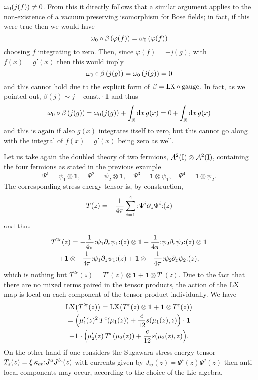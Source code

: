  $\omega_0(j(f))\neq 0$. From this it directly follows that
 a similar argument applies to the non-existence of 
 a vacuum preserving isomorphism for Bose fields; in 
 fact, if this were true then we would have
 \[
 \omega_0\circ\beta\left(\varphi(f)\right)=
 \omega_0\left(\varphi(f)\right)
 \]
 choosing $f$ integrating to zero. Then, since 
 $\varphi(f)=-j(g)$, with $f(x)=g'(x)$ then this would
 imply
 \[
 \omega_0\circ\beta\left(j(g)\right)=
 \omega_0\left(j(g)\right)=0
 \]
 and this cannot hold due to the explicit 
 form of $\beta=\textrm{LX}\circ\textrm{gauge}$. In fact, as we 
 pointed out, $\beta(j)\sim j + \textrm{const.}\cdot\bm{1}$
 and thus
 \[
 \omega_0\circ\beta\left(j(g)\right)=
 \omega_0(j(g))+\int_{\mathbb{R}}\textrm{d} x\,g(x)=
 0 +\int_{\mathbb{R}}\textrm{d} x\,g(x)
 \]
 and this is again if also $g(x)$ integrates itself to
 zero, but this cannot go along with the integral of
 $f(x)=g'(x)$ being zero as well.
 \begin{example}
 Let us take again the doubled theory of two fermions,
 $\mathcal{A}^2(\textrm{I})\otimes\mathcal{A}^2(\textrm{I})$, containing
 the four fermions as stated in the previous example 
 \[
 \Psi^1=\psi_1\otimes\bm{1},\quad \Psi^2=\psi_2\otimes\bm{1},
 \quad \Psi^3=\bm{1}\otimes\psi_1,\quad
 \Psi^4=\bm{1}\otimes\psi_2.
 \]
 The corresponding stress-energy tensor is, by 
 construction,
 \[
 T(z)=-\frac{1}{4\pi}\sum_{i=1}^4\,
 \wick{\Psi^i\partial_z\Psi^i}(z)
 \]
 and thus 
 \begin{multline*}
 T^{2c}(z)=-\frac{1}{4\pi}\wick{\psi_1\partial_z\psi_1}(z)\otimes\bm{1}
 -\frac{1}{4\pi}\wick{\psi_2\partial_z\psi_2}(z)\otimes\bm{1}\\
 +\bm{1}\otimes-\frac{1}{4\pi}\wick{\psi_1\partial_z\psi_1}(z)
 +\bm{1}\otimes-\frac{1}{4\pi}\wick{\psi_2\partial_z\psi_2}(z),
 \end{multline*}
 which is nothing but $T^{2c}(z)=T^c(z)\otimes\bm{1}
 +\bm{1}\otimes T^c(z)$. Due to the fact that there are no 
 mixed terms paired in the tensor products, the action of the 
 $\textrm{LX}$ map is local on each component of the tensor product
 individually. We have 
 \begin{multline*}
 \textrm{LX}\big(T^{2c}(z)\big)=\textrm{LX}\big(T^c(z)\otimes\bm{1}
 +\bm{1}\otimes T^c(z)\big)\\
 =\Big(\mu_1'(z)^2\,T^c(\mu_1(z))+\frac{c}{12}s(\mu_1(z),z)\Big)
 \cdot\bm{1}\\
 +\bm{1}\cdot\Big(\mu_2'(z)\,T^c(\mu_2(z))+
 \frac{c}{12}s(\mu_2(z),z)\Big).
 \end{multline*}
 On the other hand if one considers the Sugawara
 stress-energy tensor $T_s(z)=\xi\,\kappa_{ab}
 \wick{J^aJ^b}(z)$ with currents given by $J_{ij}(z)
 =\Psi^i(z)\Psi^j(z)$ then anti-local components 
 may occur, according to the choice of the Lie
 algebra.
 \end{example}
